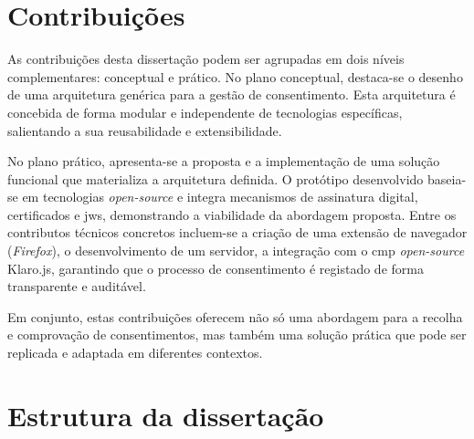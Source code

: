 
\section{Contribuições}

As contribuições desta dissertação podem ser agrupadas em dois níveis complementares: conceptual e prático. 
No plano conceptual, destaca-se o desenho de uma arquitetura genérica para a gestão de consentimento. Esta arquitetura é concebida de forma modular e independente de tecnologias específicas, salientando a sua reusabilidade e extensibilidade.

No plano prático, apresenta-se a proposta e a implementação de uma solução funcional que materializa a arquitetura definida. O protótipo desenvolvido baseia-se em tecnologias \textit{open-source} e integra mecanismos de assinatura digital, certificados e \acrfull{jws}, demonstrando a viabilidade da abordagem proposta. Entre os contributos técnicos concretos incluem-se a criação de uma extensão de navegador (\textit{Firefox}), o desenvolvimento de um servidor, a integração com o \acrshort{cmp} \textit{open-source} Klaro.js, garantindo que o processo de consentimento é registado de forma transparente e auditável.

Em conjunto, estas contribuições oferecem não só uma abordagem para a recolha e comprovação de consentimentos, mas também uma solução prática que pode ser replicada e adaptada em diferentes contextos.

\section{Estrutura da dissertação}


